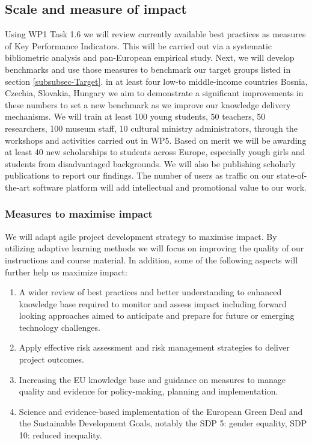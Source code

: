 \subsection{Scale and measure of impact}
Using WP1 Task 1.6 we will review currently available best practices as measures of Key Performance Indicators. This will be carried out via a systematic bibliometric analysis and pan-European empirical study. Next, we will develop benchmarks and use those measures to benchmark our target groups listed in section \ref{subsubsec-Target}. in at least four low-to middle-income countries Bosnia, Czechia, Slovakia, Hungary we aim to demonstrate a significant improvements in these numbers to set a new benchmark as we improve our knowledge delivery mechanisms. We will train at least 100 young students, 50 teachers, 50 researchers, 100 museum staff, 10 cultural ministry administrators,  through the workshops and activities carried out in WP5. Based on merit we will be awarding at least 40 new scholarships to students across Europe, especially yough girls and students from disadvantaged backgrounds. We will also be publishing scholarly publications to report our findings. The number of users as traffic on our state-of-the-art software platform will add intellectual and promotional value to our work.

\subsubsection{Measures to maximise impact}
We will adapt agile project development strategy to maximise impact. By utilizing adaptive learning methods we will focus on improving the quality of our instructions and course material. In addition, some of the following aspects will further help us maximize impact:
\begin{enumerate}[nosep,left=1mm]
\item A wider review of best practices and better understanding to enhanced knowledge base required to monitor and assess impact including forward looking approaches aimed to anticipate and prepare for future or emerging technology challenges.
\item Apply effective risk assessment and risk management strategies to deliver project outcomes.
\item Increasing the EU knowledge base and guidance on measures to manage quality and evidence for policy-making, planning and implementation.
\item Science and evidence-based implementation of the European Green Deal and the Sustainable Development Goals, notably the SDP 5: gender equality,  SDP 10: reduced inequality.
\end{enumerate}
